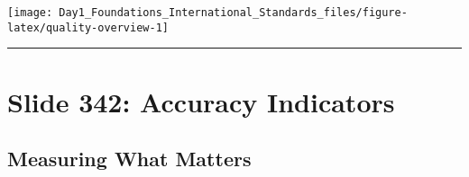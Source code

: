 \documentclass[
]{article}
\begin{document}
\texttt{[image: Day1\_Foundations\_International\_Standards\_files/figure-latex/quality-overview-1]}

\begin{center}\rule{0.5\linewidth}{0.5pt}\end{center}

\section{Slide 342: Accuracy
Indicators}\label{slide-342-accuracy-indicators}

\subsection{Measuring What Matters}\label{measuring-what-matters}
\end{document}
